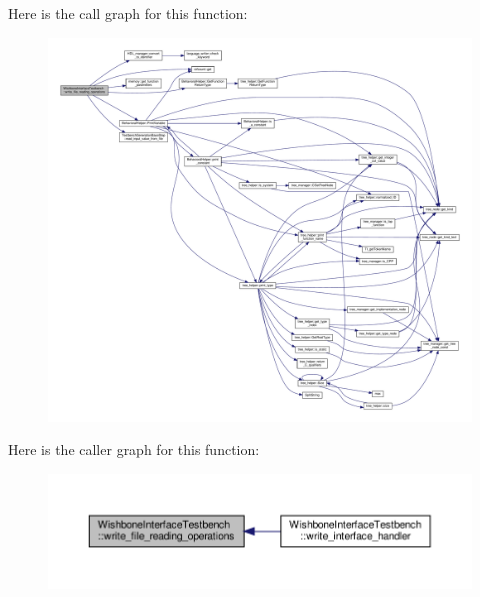 Here is the call graph for this function\+:
\nopagebreak
\begin{figure}[H]
\begin{center}
\leavevmode
\includegraphics[width=350pt]{de/ded/classWishboneInterfaceTestbench_a0ceb1c7cca0f25da26b7eff3797489bf_cgraph}
\end{center}
\end{figure}
Here is the caller graph for this function\+:
\nopagebreak
\begin{figure}[H]
\begin{center}
\leavevmode
\includegraphics[width=350pt]{de/ded/classWishboneInterfaceTestbench_a0ceb1c7cca0f25da26b7eff3797489bf_icgraph}
\end{center}
\end{figure}
\mbox{\label{classWishboneInterfaceTestbench_a8a656572943eb09c0da774d124ab7a05}} 
